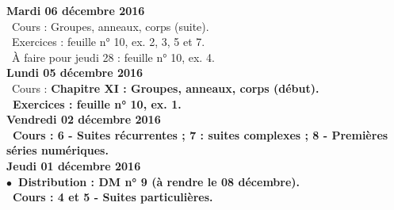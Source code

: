 \documentclass[12pt,a4paper]{article}
\begin{document}
%  
%  

\noindent\textbf{ Mardi 06 décembre 2016 } \\
\bu\ Cours : Groupes, anneaux, corps (suite).\\
\bu\ Exercices : feuille n° 10, ex. 2, 3, 5 et 7.\\
\bu\ À faire pour jeudi 28 : feuille n° 10, ex. 4.\vspace{.4cm}\\

\noindent\textbf{ Lundi 05 décembre 2016 } \\
\bu\ Cours : \bf Chapitre XI \rm : Groupes, anneaux, corps (début).\\
\bu\ Exercices : feuille n° 10, ex. 1.\vspace{.4cm}\\
  
\noindent\textbf{Vendredi 02 décembre 2016 }\\
\bu\ Cours : 6 - Suites récurrentes ; 7 : suites complexes ; 8 - Premières séries numériques.\vspace{.4cm}\\
  
\noindent\textbf{Jeudi 01 décembre 2016 }\\
$\bullet$\ Distribution : DM n° 9 (à rendre le 08 décembre).\\
\bu\ Cours : 4 et 5 - Suites particulières.\vspace{.4cm}\\
\end{document}
